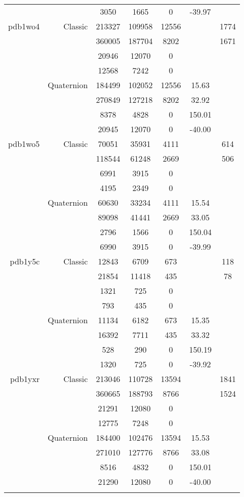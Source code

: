\begin{xltabular}{\textwidth}{r|rcccSc}
& & 3050 & 1665 & 0 & -39.97 & \\ \addlinespace
pdb1wo4 & Classic & 213327 & 109958 & 12556 & & 1774 \\
& & 360005 & 187704 & 8202 & & 1671 \\
& & 20946 & 12070 & 0 & & \\
& & 12568 & 7242 & 0 & & \\
& Quaternion & 184499 & 102052 & 12556 & 15.63 & \\
& & 270849 & 127218 & 8202 & 32.92 & \\
& & 8378 & 4828 & 0 & 150.01 & \\
& & 20945 & 12070 & 0 & -40.00 & \\ \addlinespace
pdb1wo5 & Classic & 70051 & 35931 & 4111 & & 614 \\
& & 118544 & 61248 & 2669 & & 506 \\
& & 6991 & 3915 & 0 & & \\
& & 4195 & 2349 & 0 & & \\
& Quaternion & 60630 & 33234 & 4111 & 15.54 & \\
& & 89098 & 41441 & 2669 & 33.05 & \\
& & 2796 & 1566 & 0 & 150.04 & \\
& & 6990 & 3915 & 0 & -39.99 & \\ \addlinespace
pdb1y5c & Classic & 12843 & 6709 & 673 & & 118 \\
& & 21854 & 11418 & 435 & & 78 \\
& & 1321 & 725 & 0 & & \\
& & 793 & 435 & 0 & & \\
& Quaternion & 11134 & 6182 & 673 & 15.35 & \\
& & 16392 & 7711 & 435 & 33.32 & \\
& & 528 & 290 & 0 & 150.19 & \\
& & 1320 & 725 & 0 & -39.92 & \\ \addlinespace
pdb1yxr & Classic & 213046 & 110728 & 13594 & & 1841 \\
& & 360665 & 188793 & 8766 & & 1524 \\
& & 21291 & 12080 & 0 & & \\
& & 12775 & 7248 & 0 & & \\
& Quaternion & 184400 & 102476 & 13594 & 15.53 & \\
& & 271010 & 127776 & 8766 & 33.08 & \\
& & 8516 & 4832 & 0 & 150.01 & \\
& & 21290 & 12080 & 0 & -40.00 & \\ \addlinespace

\end{xltabular}
